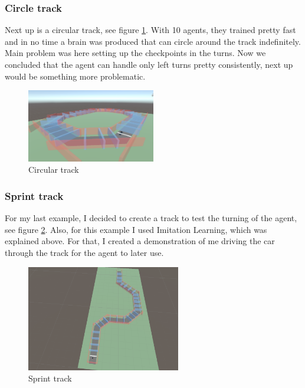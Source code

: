 \documentclass[a4paper,12pt,openright]{book}
\begin{document}
\subsubsection{Circle track}

Next up is a circular track, see figure \ref{CircleTrack}. With 10 agents, they trained pretty fast and in no time a brain was produced that can circle around the track indefinitely. Main problem was here setting up the checkpoints in the turns. Now we concluded that the agent can handle only left turns pretty consistently, next up would be something more problematic.

\begin{figure}[h]
\begin{center}
\includegraphics[width=0.5\textwidth]{Images/CircleTrack.png}
\end{center}
\caption{Circular track}
\label{CircleTrack}
\end{figure}

\clearpage

\subsubsection{Sprint track}

For my last example, I decided to create a track to test the turning of the agent, see figure \ref{SprintTrack}. Also, for this example I used Imitation Learning, which was explained above. For that, I created a demonstration of me driving the car through the track for the agent to later use.

\begin{figure}[h]
\begin{center}
\includegraphics[width=0.6\textwidth]{Images/SprintTrack.png}
\end{center}
\caption{Sprint track}
\label{SprintTrack}
\end{figure}
\end{document}
